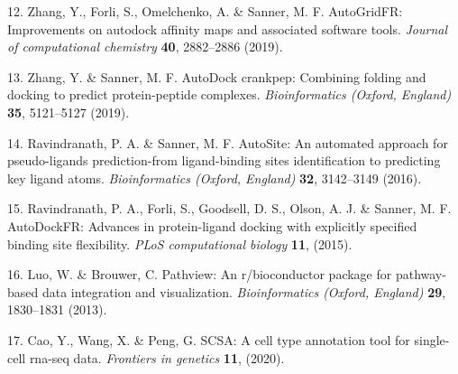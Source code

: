 \documentclass[
]{article}
\newenvironment{cslreferences}%
  {}%
  {\par}
\begin{document}
\begin{cslreferences}
\leavevmode\hypertarget{ref-AutogridfrImpZhang2019}{}%
12. Zhang, Y., Forli, S., Omelchenko, A. \& Sanner, M. F. AutoGridFR: Improvements on autodock affinity maps and associated software tools. \emph{Journal of computational chemistry} \textbf{40}, 2882--2886 (2019).

\leavevmode\hypertarget{ref-AutodockCrankpZhang2019}{}%
13. Zhang, Y. \& Sanner, M. F. AutoDock crankpep: Combining folding and docking to predict protein-peptide complexes. \emph{Bioinformatics (Oxford, England)} \textbf{35}, 5121--5127 (2019).

\leavevmode\hypertarget{ref-AutositeAnAuRavind2016}{}%
14. Ravindranath, P. A. \& Sanner, M. F. AutoSite: An automated approach for pseudo-ligands prediction-from ligand-binding sites identification to predicting key ligand atoms. \emph{Bioinformatics (Oxford, England)} \textbf{32}, 3142--3149 (2016).

\leavevmode\hypertarget{ref-AutodockfrAdvRavind2015}{}%
15. Ravindranath, P. A., Forli, S., Goodsell, D. S., Olson, A. J. \& Sanner, M. F. AutoDockFR: Advances in protein-ligand docking with explicitly specified binding site flexibility. \emph{PLoS computational biology} \textbf{11}, (2015).

\leavevmode\hypertarget{ref-PathviewAnRLuoW2013}{}%
16. Luo, W. \& Brouwer, C. Pathview: An r/bioconductor package for pathway-based data integration and visualization. \emph{Bioinformatics (Oxford, England)} \textbf{29}, 1830--1831 (2013).

\leavevmode\hypertarget{ref-ScsaACellTyCaoY2020}{}%
17. Cao, Y., Wang, X. \& Peng, G. SCSA: A cell type annotation tool for single-cell rna-seq data. \emph{Frontiers in genetics} \textbf{11}, (2020).
\end{cslreferences}
\end{document}
